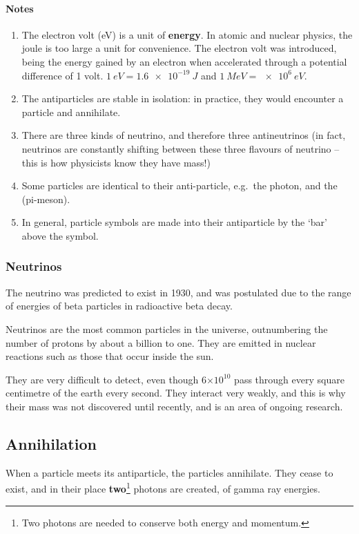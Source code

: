 \documentclass[a4paper,12pt]{article}
\providecommand{\e}[1]{\ensuremath{\times 10^{#1}}}
\begin{document}
\paragraph{Notes}\begin{enumerate}
\item The electron volt (eV) is a unit of {\bf energy}.  In atomic and nuclear physics, the joule is too large a unit for convenience.  The electron volt was introduced, being the energy gained by an electron when accelerated through a potential difference of 1 volt.  $\SI{1}{eV}=\SI{1.6e-19}{J}$ and $\SI{1}{MeV}=\SI{e6}{eV}$.
\item The antiparticles are stable in isolation: in practice, they would encounter a particle and annihilate.
\item There are three kinds of neutrino, and therefore three antineutrinos (in fact, neutrinos are constantly shifting between these three flavours of neutrino -- this is how physicists know they have mass!)
\item Some particles are identical to their anti-particle, e.g.\ the photon, and the \Ppizero (pi-meson).
\item In general, particle symbols are made into their antiparticle by the `bar' above the symbol.
\end{enumerate}

\subsubsection{Neutrinos}
The neutrino was predicted to exist in 1930, and was postulated due to the range of energies of beta particles in radioactive beta decay.

Neutrinos are the most common particles in the universe, outnumbering the number of protons by about a billion to one.  They are emitted in nuclear reactions such as those that occur inside the sun.

They are very difficult to detect, even though 6\e{10} pass through every square centimetre of the earth every second.  They interact very weakly, and this is why their mass was not discovered until recently, and is an area of ongoing research.


\subsection{Annihilation}

When a particle meets its antiparticle, the particles annihilate.  They cease to exist, and in their place {\bf two}\footnote{Two photons are needed to conserve both energy and momentum.} photons are created, of gamma ray energies.
\end{document}
